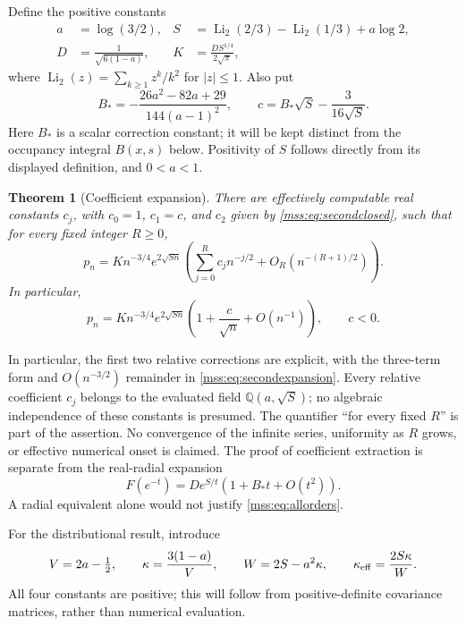 \documentclass[11pt,letterpaper]{article}
\numberwithin{equation}{section}
\newtheorem{theorem}{Theorem}[section]
\theoremstyle{definition}\newtheorem{definition}[theorem]{Definition}
\theoremstyle{remark}\newtheorem{remark}[theorem]{Remark}
\DeclareMathOperator{\Li}{Li}
\begin{document}
Define the positive constants
\begin{align}\label{mss:eq:constants}
a&=\log(3/2), &
S&=\Li_2(2/3)-\Li_2(1/3)+a\log2,\\
D&=\frac1{\sqrt{6(1-a)}}, &
K&=\frac{DS^{1/4}}{2\sqrt\pi},\nonumber
\end{align}
where $\Li_2(z)=\sum_{k\ge1}z^k/k^2$ for $|z|\le1$. Also put
\begin{equation}\label{mss:eq:Bc}
B_*=-\frac{26a^2-82a+29}{144(a-1)^2},
\qquad c=B_*\sqrt S-\frac3{16\sqrt S}.
\end{equation}
Here $B_*$ is a scalar correction constant; it will be kept distinct from the occupancy integral $B(x,s)$ below. Positivity of $S$ follows directly from its displayed definition, and $0<a<1$.

\begin{theorem}[Coefficient expansion]\label{mss:thm:main}
There are effectively computable real constants $c_j$, with $c_0=1$, $c_1=c$, and $c_2$ given by \eqref{mss:eq:secondclosed}, such that for every fixed integer $R\ge0$,
\begin{equation}\label{mss:eq:allorders}
p_n=K n^{-3/4}e^{2\sqrt{Sn}}
\left(\sum_{j=0}^{R}c_jn^{-j/2}
+O_R(n^{-(R+1)/2})\right).
\end{equation}
In particular,
\begin{equation}\label{mss:eq:first}
p_n=K n^{-3/4}e^{2\sqrt{Sn}}
\left(1+\frac{c}{\sqrt n}+O(n^{-1})\right),\qquad c<0.
\end{equation}
\end{theorem}
In particular, the first two relative corrections are explicit, with the three-term form and $O(n^{-3/2})$ remainder in \eqref{mss:eq:secondexpansion}.
Every relative coefficient $c_j$ belongs to the evaluated field $\mathbb Q(a,\sqrt S)$; no algebraic independence of these constants is presumed. The quantifier ``for every fixed $R$'' is part of the assertion. No convergence of the infinite series, uniformity as $R$ grows, or effective numerical onset is claimed. The proof of coefficient extraction is separate from the real-radial expansion
\begin{equation}\label{mss:eq:radialintro}
F(e^{-t})=De^{S/t}\left(1+B_*t+O(t^2)\right).
\end{equation}
A radial equivalent alone would not justify \eqref{mss:eq:allorders}.

For the distributional result, introduce
\begin{equation}\label{mss:eq:lawconstants}
V=2a-\tfrac12,\qquad
\kappa=\frac{3(1-a)}{V},\qquad
W=2S-a^2\kappa,\qquad
\kappa_{\rm eff}=\frac{2S\kappa}{W}.
\end{equation}
All four constants are positive; this will follow from positive-definite covariance matrices, rather than numerical evaluation.
\end{document}
